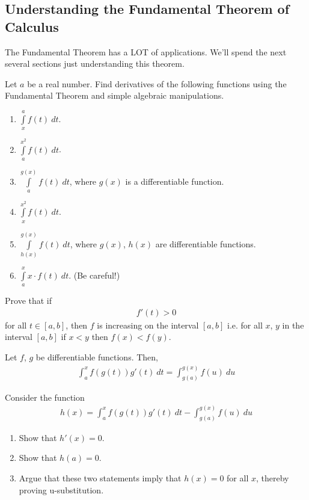 \subsection{Understanding the Fundamental Theorem of Calculus}
The Fundamental Theorem has a LOT of applications. We'll spend the next several sections just understanding this theorem.
\begin{exercise}
	Let $a$ be a real number. Find derivatives of the following functions using the Fundamental Theorem and simple algebraic manipulations.
	\begin{enumerate}
		\item $\int \limits_{x}^{a} f(t) \: dt$.
		\item $\int \limits_a^{x^2} f(t) \: dt$.
		\item $\int \limits_a^{g(x)} f(t) \: dt$, where	$g(x)$ is a differentiable function.
		\item $\int \limits_{x}^{x^2} f(t) \: dt$.
		\item $\int \limits_{h(x)}^{g(x)} f(t) \: dt$, where	$g(x)$, $h(x)$ are differentiable functions.
		\item $\int \limits_a^{x} x \cdot f(t) \: dt$. (Be careful!)
	\end{enumerate}
\end{exercise}

\begin{exercise}
	Prove that if
	\begin{align*}
		f'(t) > 0
	\end{align*}
	for all $t \in [a,b]$, then $f$ is increasing on the interval $[a,b]$ i.e. for all $x$, $y$ in the interval $[a,b]$ if $x < y$ then $f(x) < f(y)$.
\end{exercise}

\begin{theorem}[u-substitution]
	Let $f$, $g$ be differentiable functions. Then,
	\begin{align*}
		\int_a^x f(g(t)) g'(t)\: dt = \int_{g(a)}^{g(x)} f(u) \: du
	\end{align*}
\end{theorem}
\begin{exercise} Consider the function
	\begin{align*}
		h(x)
		=
		\int_a^x f(g(t)) g'(t)\: dt - \int_{g(a)}^{g(x)} f(u) \: du
	\end{align*}
\begin{enumerate}
	\item Show that $h'(x) = 0$.
	\item Show that $h(a) = 0$.
	\item Argue that these two statements imply that $h(x) = 0$ for all $x$, thereby proving u-substitution.
\end{enumerate}
\end{exercise}


